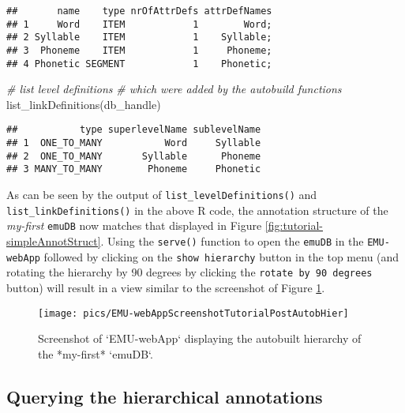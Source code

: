 \documentclass[
]{book}
\newenvironment{Shaded}{\begin{snugshade}}{\end{snugshade}}
\newcommand{\CommentTok}[1]{\textcolor[rgb]{0.56,0.35,0.01}{\textit{#1}}}
\newcommand{\FunctionTok}[1]{\textcolor[rgb]{0.00,0.00,0.00}{#1}}
\newcommand{\NormalTok}[1]{#1}
\begin{document}
\begin{verbatim}
##       name    type nrOfAttrDefs attrDefNames
## 1     Word    ITEM            1        Word;
## 2 Syllable    ITEM            1    Syllable;
## 3  Phoneme    ITEM            1     Phoneme;
## 4 Phonetic SEGMENT            1    Phonetic;
\end{verbatim}

\begin{Shaded}
\begin{Highlighting}[]
\CommentTok{\# list level definitions}
\CommentTok{\# which were added by the autobuild functions}
\FunctionTok{list\_linkDefinitions}\NormalTok{(db\_handle)}
\end{Highlighting}
\end{Shaded}

\begin{verbatim}
##           type superlevelName sublevelName
## 1  ONE_TO_MANY           Word     Syllable
## 2  ONE_TO_MANY       Syllable      Phoneme
## 3 MANY_TO_MANY        Phoneme     Phonetic
\end{verbatim}

As can be seen by the output of \texttt{list\_levelDefinitions()} and \texttt{list\_linkDefinitions()} in the above R code, the annotation structure of the \emph{my-first} \texttt{emuDB} now matches that displayed in Figure \ref{fig:tutorial-simpleAnnotStruct}. Using the \texttt{serve()} function to open the \texttt{emuDB} in the \texttt{EMU-webApp} followed by clicking on the \texttt{show\ hierarchy} button in the top menu (and rotating the hierarchy by 90 degrees by clicking the \texttt{rotate\ by\ 90\ degrees} button) will result in a view similar to the screenshot of Figure \ref{fig:tutorial-EMU-webAppScreenshotTutorialPostAutobHier}.

\begin{figure}

{\centering \texttt{[image: pics/EMU-webAppScreenshotTutorialPostAutobHier]} 

}

\caption{Screenshot of `EMU-webApp` displaying the autobuilt hierarchy of the *my-first* `emuDB`.}\label{fig:tutorial-EMU-webAppScreenshotTutorialPostAutobHier}
\end{figure}

\hypertarget{querying-the-hierarchical-annotations}{%
\subsection{Querying the hierarchical annotations}\label{querying-the-hierarchical-annotations}}
\end{document}
